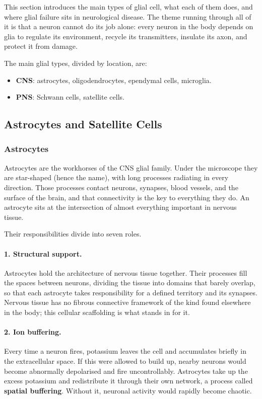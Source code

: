 \documentclass[11pt]{article}
\begin{document}
This section introduces the main types of glial cell, what each of them does, and where glial failure sits in neurological disease. The theme running through all of it is that a neuron cannot do its job alone: every neuron in the body depends on glia to regulate its environment, recycle its transmitters, insulate its axon, and protect it from damage.

The main glial types, divided by location, are:

\begin{itemize}
    \item \textbf{CNS}: astrocytes, oligodendrocytes, ependymal cells, microglia.
    \item \textbf{PNS}: Schwann cells, satellite cells.
\end{itemize}

\subsection{Astrocytes and Satellite Cells}

\subsubsection{Astrocytes}

Astrocytes are the workhorses of the CNS glial family. Under the microscope they are star-shaped (hence the name), with long processes radiating in every direction. Those processes contact neurons, synapses, blood vessels, and the surface of the brain, and that connectivity is the key to everything they do. An astrocyte sits at the intersection of almost everything important in nervous tissue.

Their responsibilities divide into seven roles.

\paragraph{1. Structural support.} Astrocytes hold the architecture of nervous tissue together. Their processes fill the spaces between neurons, dividing the tissue into domains that barely overlap, so that each astrocyte takes responsibility for a defined territory and its synapses. Nervous tissue has no fibrous connective framework of the kind found elsewhere in the body; this cellular scaffolding is what stands in for it.

\paragraph{2. Ion buffering.} Every time a neuron fires, potassium leaves the cell and accumulates briefly in the extracellular space. If this were allowed to build up, nearby neurons would become abnormally depolarised and fire uncontrollably. Astrocytes take up the excess potassium and redistribute it through their own network, a process called \textbf{spatial buffering}. Without it, neuronal activity would rapidly become chaotic.
\end{document}
